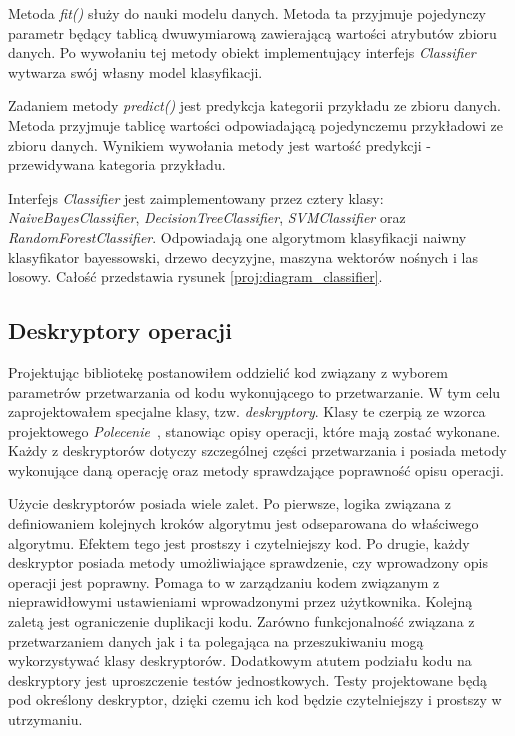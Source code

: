 \documentclass[../thesis.tex]{subfiles}
\begin{document}
Metoda \emph{fit()} służy do nauki modelu danych. Metoda ta przyjmuje pojedynczy parametr będący tablicą dwuwymiarową zawierającą wartości atrybutów zbioru danych. Po wywołaniu tej metody obiekt implementujący interfejs \emph{Classifier} wytwarza swój własny model klasyfikacji.

Zadaniem metody \emph{predict()} jest predykcja kategorii przykładu ze zbioru danych. Metoda przyjmuje tablicę wartości odpowiadającą pojedynczemu przykładowi ze zbioru danych. Wynikiem wywołania metody jest wartość predykcji - przewidywana kategoria przykładu.

Interfejs \emph{Classifier} jest zaimplementowany przez cztery klasy: \emph{NaiveBayesClassifier}, \emph{DecisionTreeClassifier}, \emph{SVMClassifier} oraz \emph{RandomForestClassifier}. Odpowiadają one algorytmom klasyfikacji naiwny klasyfikator bayessowski, drzewo decyzyjne, maszyna wektorów nośnych i las losowy. Całość przedstawia rysunek \ref{proj:diagram_classifier}.

\subsection{Deskryptory operacji}
\label{proj:descriptors}

Projektując bibliotekę postanowiłem oddzielić kod związany z wyborem parametrów przetwarzania od kodu wykonującego to przetwarzanie. W tym celu zaprojektowałem specjalne klasy, tzw. \emph{deskryptory}. Klasy te czerpią ze wzorca projektowego \emph{Polecenie}~\cite{gang_of_four}, stanowiąc opisy operacji, które mają zostać wykonane. Każdy z deskryptorów dotyczy szczególnej części przetwarzania i posiada metody wykonujące daną operację oraz metody sprawdzające poprawność opisu operacji.

Użycie deskryptorów posiada wiele zalet. Po pierwsze, logika związana z definiowaniem kolejnych kroków algorytmu jest odseparowana do właściwego algorytmu. Efektem tego jest prostszy i czytelniejszy kod. Po drugie, każdy deskryptor posiada metody umożliwiające sprawdzenie, czy wprowadzony opis operacji jest poprawny. Pomaga to w zarządzaniu kodem związanym z nieprawidłowymi ustawieniami wprowadzonymi przez użytkownika. Kolejną zaletą jest ograniczenie duplikacji kodu. Zarówno funkcjonalność związana z przetwarzaniem danych jak i ta polegająca na przeszukiwaniu mogą wykorzystywać klasy deskryptorów. Dodatkowym atutem podziału kodu na deskryptory jest uproszczenie testów jednostkowych. Testy projektowane będą pod określony deskryptor, dzięki czemu ich kod będzie czytelniejszy i prostszy w utrzymaniu.
\end{document}
